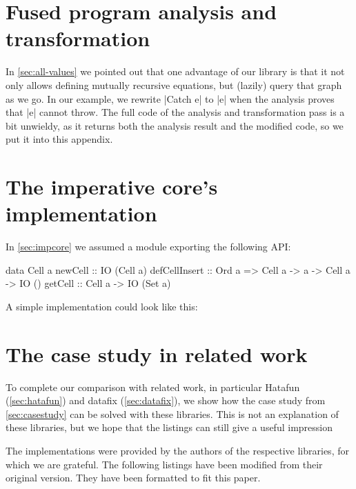 \documentclass[manuscript,screen,acmsmall,nonacm]{acmart}
\begin{document}
\section{Fused program analysis and transformation}\label{sec:proganalexp}

In \cref{sec:all-values} we pointed out that one advantage of our library is that it not only allows defining mutually recursive equations, but (lazily) query that graph as we go. In our example, we rewrite |Catch e| to |e| when the analysis proves that |e| cannot throw. The full code of the analysis and transformation pass is a bit unwieldy, as it returns both the analysis result and the modified code, so we put it into this appendix.


\section{The imperative core's implementation}\label{sec:impcoreimpl}

In \cref{sec:impcore} we assumed a module exporting the following API:
\begin{code}
data Cell a
newCell        ::                                      IO (Cell a)
defCellInsert  ::  Ord a =>  Cell a -> a -> Cell a ->  IO ()
getCell        ::            Cell a ->                 IO (Set a)
\end{code}

\noindent 
A simple implementation could look like this:


\section{The case study in related work}

To complete our comparison with related work, in particular Hatafun (\cref{sec:hatafun}) and datafix (\cref{sec:datafix}), we show how the case study from \cref{sec:casestudy} can be solved with these libraries. This is not an explanation of these libraries, but we hope that the listings can still give a useful impression

The implementations were provided by the authors of the respective libraries, for which we are grateful. The following listings have been modified from their original version. They have been formatted to fit this paper.
\end{document}
